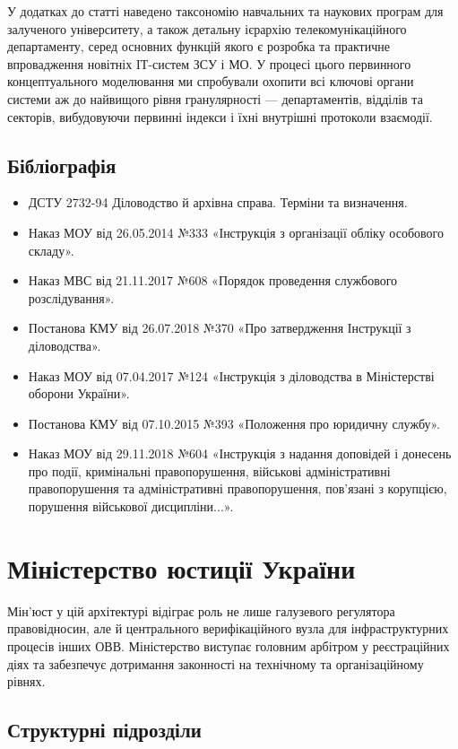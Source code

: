 У додатках до статті наведено таксономію навчальних та наукових програм для залученого університету, а також детальну ієрархію телекомунікаційного департаменту, серед основних функцій якого є розробка та практичне впровадження новітніх IТ-систем ЗСУ і МО. У процесі цього первинного концептуального моделювання ми спробували охопити всі ключові органи системи аж до найвищого рівня гранулярності — департаментів, відділів та секторів, вибудовуючи первинні індекси і їхні внутрішні протоколи взаємодії.

\subsection*{Бібліографія}

\begin{itemize}
    \item ДСТУ 2732-94 Діловодство й архівна справа. Терміни та визначення.
    \item Наказ МОУ від 26.05.2014 №333 «Інструкція з організації обліку особового складу».
    \item Наказ МВС від 21.11.2017 №608 «Порядок проведення службового розслідування».
    \item Постанова КМУ від 26.07.2018 №370 «Про затвердження Інструкції з діловодства».
    \item Наказ МОУ від 07.04.2017 №124 «Інструкція з діловодства в Міністерстві оборони України».
    \item Постанова КМУ від 07.10.2015 №393 «Положення про юридичну службу».
    \item Наказ МОУ від 29.11.2018 №604 «Інструкція з надання доповідей і донесень про події, кримінальні правопорушення, військові адміністративні правопорушення та адміністративні правопорушення, пов'язані з корупцією, порушення військової дисципліни...».
\end{itemize}

\newpage
\section{Міністерство юстиції України}

Мін'юст у цій архітектурі відіграє роль не лише галузевого регулятора правовідносин, але й центрального верифікаційного вузла для інфраструктурних процесів інших ОВВ. Міністерство виступає головним арбітром у реєстраційних діях та забезпечує дотримання законності на технічному та організаційному рівнях.

\subsection*{Структурні підрозділи}

